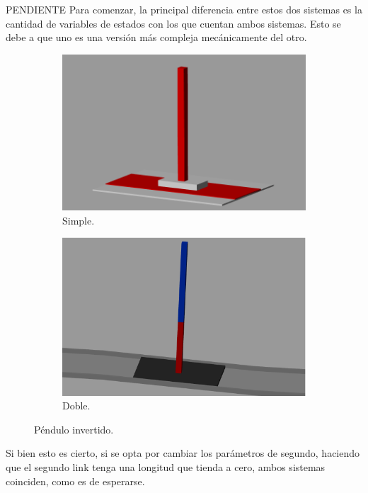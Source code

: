 PENDIENTE
Para comenzar, la principal diferencia entre estos dos sistemas es la cantidad de variables de estados con los que cuentan ambos sistemas.
Esto se debe a que uno es una versión más compleja mecánicamente del otro.
\begin{figure}[H]
\begin{subfigure}{.5\textwidth}
  \centering
  \includegraphics[width=0.95\linewidth]{../Analisis de Resultados/ImagenesAnalisis de Resultados/equilibrio.png}
  \caption{Simple.}
  \label{fig:sfig1}
\end{subfigure}%
\begin{subfigure}{.5\textwidth}
  \centering
  \includegraphics[width=0.95\linewidth]{../Analisis de Resultados/ImagenesAnalisis de Resultados/simscape_double_pendulum.png}
  \caption{Doble.}
  \label{fig:sfig2}
\end{subfigure}
\caption{Péndulo invertido.}
\label{fig:fig}
\end{figure}
Si bien esto es cierto, si se opta por cambiar los parámetros de segundo, haciendo que el segundo link tenga una longitud que tienda a cero, ambos sistemas coinciden, como es de esperarse.

